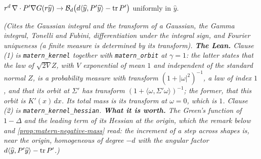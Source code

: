 \begin{lemma}
\begin{enumerate}
$r^d\,\nabla\cdot P'\nabla G(r\widehat y) \to \mathcal{B}_d\bigl(d\langle\widehat y,P'\widehat y\rangle - \operatorname{tr} P'\bigr)$
uniformly in $\widehat y$.
\end{enumerate}
\statusT\quad\emph{(Cites the Gaussian integral and the transform of a Gaussian, the Gamma
integral, Tonelli and Fubini, differentiation under the integral sign, and Fourier uniqueness (a
finite measure is determined by its transform). \textbf{The Lean.} Clause (1) is
\texttt{matern\_kernel} together with \texttt{matern\_orbit} at $\gamma = 1$: the latter states that
the law of $\sqrt{2V}Z$, with $V$ exponential of mean $1$ and independent of the standard normal
$Z$, is a probability measure with transform
$(1+|\omega|^2)^{-1}$, a \Matern{} law of index $1$, and that its orbit at $\Sigma'$ has transform
$(1 + \langle\omega,\Sigma'\omega\rangle)^{-1}$; the former, that this orbit is $K'(x)\,dx$. Its total mass is
its transform at $\omega = 0$, which is $1$. Clause (2) is \texttt{matern\_kernel\_hessian}.
\textbf{What it is worth.} The
Green's function of $1 - \Delta$ and the leading term of its Hessian at the origin, which the remark
below and \ref{prop:matern-negative-mass} read: the increment of a step across shapes is, near the
origin, homogeneous of degree $-d$ with the angular factor $d\langle\widehat y,P'\widehat y\rangle - \operatorname{tr} P'$.)}
\end{lemma}

